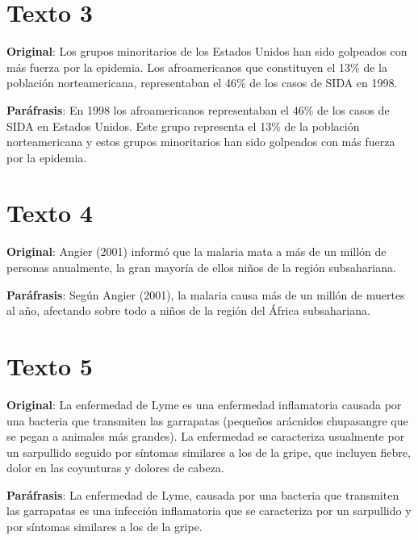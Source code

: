 \documentclass{article}
\begin{document}
\section*{Texto 3} \vspace{0.5cm}

\textcolor{trueblue}{\textbf{Original}}: Los grupos minoritarios de los Estados Unidos han sido golpeados con más fuerza por la epidemia. Los afroamericanos que constituyen el 13\% de la población norteamericana, representaban el 46\% de los casos de SIDA en 1998.

\textcolor{Apple Green}{\textbf{Paráfrasis}}: En 1998 los afroamericanos representaban el 46\% de los casos de SIDA  en Estados Unidos. Este grupo representa el 13\% de la población norteamericana y estos grupos minoritarios han sido golpeados con más fuerza por la epidemia.

\section*{Texto 4} \vspace{0.5cm}

\textcolor{trueblue}{\textbf{Original}}: Angier (2001) informó que la malaria mata a más de un millón de personas anualmente, la gran mayoría de ellos niños de la región subsahariana.

\textcolor{Apple Green}{\textbf{Paráfrasis}}: Según Angier (2001), la malaria causa más de un millón de muertes al año, afectando sobre todo a niños de la región del África subsahariana.

\section*{Texto 5} \vspace{0.5cm}

\textcolor{trueblue}{\textbf{Original}}: La enfermedad de Lyme es una enfermedad inflamatoria causada por
una bacteria que transmiten las garrapatas (pequeños arácnidos chupasangre que
se pegan a animales más grandes). La enfermedad se caracteriza usualmente por
un sarpullido seguido por síntomas similares a los de la gripe, que incluyen fiebre,
dolor en las coyunturas y dolores de cabeza.

\textcolor{Apple Green}{\textbf{Paráfrasis}}: La enfermedad de Lyme, causada por una bacteria que transmiten las garrapatas es una infección inflamatoria que se caracteriza por un sarpullido y por síntomas similares a los de la gripe.
\end{document}
